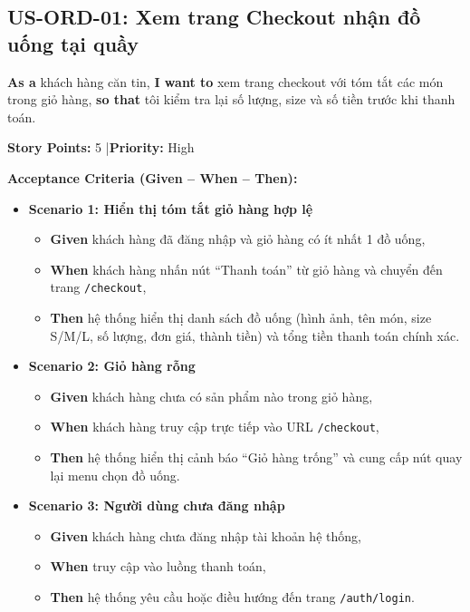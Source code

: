 \documentclass[12pt,a4paper]{article}
\begin{document}
\subsection{US-ORD-01: Xem trang Checkout nhận đồ uống tại quầy}

\textbf{As a} khách hàng căn tin, \textbf{I want to} xem trang checkout với tóm tắt các món trong giỏ hàng, \textbf{so that} tôi kiểm tra lại số lượng, size và số tiền trước khi thanh toán.

\textbf{Story Points:} 5 \quad|\quad \textbf{Priority:} High

\textbf{Acceptance Criteria (Given -- When -- Then):}
\begin{itemize}
  \item \textbf{Scenario 1: Hiển thị tóm tắt giỏ hàng hợp lệ}
  \begin{itemize}
    \item \textbf{Given} khách hàng đã đăng nhập và giỏ hàng có ít nhất 1 đồ uống,
    \item \textbf{When} khách hàng nhấn nút ``Thanh toán'' từ giỏ hàng và chuyển đến trang \texttt{/checkout},
    \item \textbf{Then} hệ thống hiển thị danh sách đồ uống (hình ảnh, tên món, size S/M/L, số lượng, đơn giá, thành tiền) và tổng tiền thanh toán chính xác.
  \end{itemize}
  \item \textbf{Scenario 2: Giỏ hàng rỗng}
  \begin{itemize}
    \item \textbf{Given} khách hàng chưa có sản phẩm nào trong giỏ hàng,
    \item \textbf{When} khách hàng truy cập trực tiếp vào URL \texttt{/checkout},
    \item \textbf{Then} hệ thống hiển thị cảnh báo ``Giỏ hàng trống'' và cung cấp nút quay lại menu chọn đồ uống.
  \end{itemize}
  \item \textbf{Scenario 3: Người dùng chưa đăng nhập}
  \begin{itemize}
    \item \textbf{Given} khách hàng chưa đăng nhập tài khoản hệ thống,
    \item \textbf{When} truy cập vào luồng thanh toán,
    \item \textbf{Then} hệ thống yêu cầu hoặc điều hướng đến trang \texttt{/auth/login}.
  \end{itemize}
\end{itemize}
\end{document}
